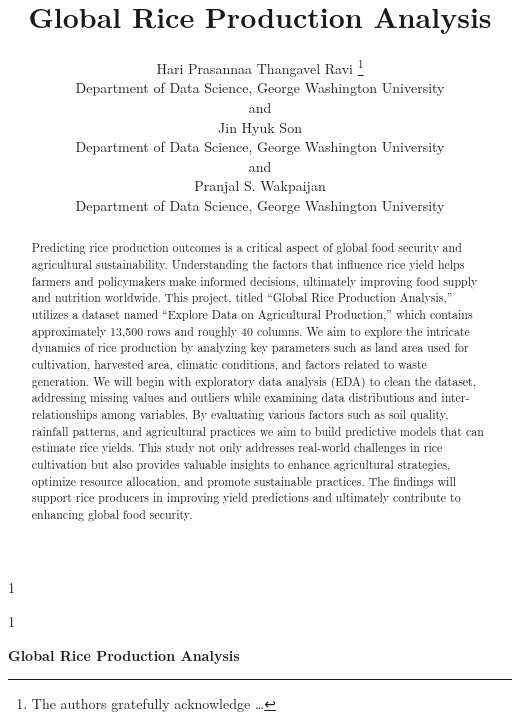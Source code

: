 \documentclass[12pt]{article}
\newcommand{\blind}{1}
\begin{document}
\def\spacingset#1{\renewcommand{\baselinestretch}%
{#1}\small\normalsize} \spacingset{1}



\blind
{
  \title{\bf Global Rice Production Analysis}

  \author{
        Hari Prasannaa Thangavel Ravi \thanks{The authors gratefully
acknowledge \ldots{}} \\
    Department of Data Science, George Washington University\\
     and \\     Jin Hyuk Son \\
    Department of Data Science, George Washington University\\
     and \\     Pranjal S. Wakpaijan \\
    Department of Data Science, George Washington University\\
      }
  \maketitle
} \fi

\blind
{
  \bigskip
  \bigskip
  \bigskip
  \begin{center}
    {\LARGE\bf Global Rice Production Analysis}
  \end{center}
  \medskip
} \fi

\bigskip
\begin{abstract}
Predicting rice production outcomes is a critical aspect of global food
security and agricultural sustainability. Understanding the factors that
influence rice yield helps farmers and policymakers make informed
decisions, ultimately improving food supply and nutrition worldwide.
This project, titled ``Global Rice Production Analysis,'' utilizes a
dataset named ``Explore Data on Agricultural Production,'' which
contains approximately 13,500 rows and roughly 40 columns. We aim to
explore the intricate dynamics of rice production by analyzing key
parameters such as land area used for cultivation, harvested area,
climatic conditions, and factors related to waste generation. We will
begin with exploratory data analysis (EDA) to clean the dataset,
addressing missing values and outliers while examining data
distributions and inter-relationships among variables. By evaluating
various factors such as soil quality, rainfall patterns, and
agricultural practices we aim to build predictive models that can
estimate rice yields. This study not only addresses real-world
challenges in rice cultivation but also provides valuable insights to
enhance agricultural strategies, optimize resource allocation, and
promote sustainable practices. The findings will support rice producers
in improving yield predictions and ultimately contribute to enhancing
global food security.
\end{abstract}
\end{document}
